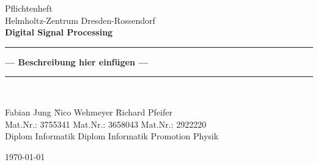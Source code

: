 \documentclass[paper=a4, headings=small]{scrartcl}
\begin{document}
\begin{titlepage}
\begin{center}
	\large{Pflichtenheft\\ Helmholtz-Zentrum Dresden-Rossendorf } \\[10mm]
	\textbf{\Large{Digital Signal Processing}}\\[5mm]
	\rule{\linewidth}{0.5mm}
	\textbf{\LARGE{ --- Beschreibung hier einfügen ---}}
	\rule{\linewidth}{0.5mm}\\[3cm]

\parbox{0cm}{
\begin{tabbing}
  Fabian Jung	              \hspace{2cm}	\= Nico Wehmeyer  \hspace{2cm}	\= Richard Pfeifer\\
  Mat.Nr.:  3755341                         \> Mat.Nr.: 3658043			    \> Mat.Nr.: 2922220\\
  Diplom Informatik 			            \> Diplom Informatik     	    \> Promotion Physik\\
\end{tabbing}
}

\vfill
{\large \today}
\end{center}

\end{titlepage}

\tableofcontents
\newpage

\newpage

\newpage

\end{document}
